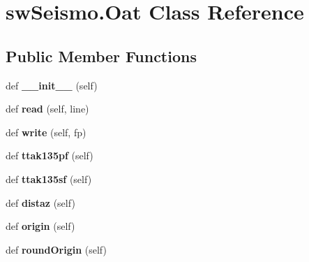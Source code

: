 \hypertarget{classswSeismo_1_1Oat}{}\section{sw\+Seismo.\+Oat Class Reference}
\label{classswSeismo_1_1Oat}
\subsection*{Public Member Functions}
\begin{DoxyCompactItemize}
\item 
\hypertarget{classswSeismo_1_1Oat_a5a2cfee3e2b780b1fb7dc905b30987e0}{}def {\bfseries \+\_\+\+\_\+init\+\_\+\+\_\+} (self)\label{classswSeismo_1_1Oat_a5a2cfee3e2b780b1fb7dc905b30987e0}

\item 
\hypertarget{classswSeismo_1_1Oat_a3a4e0f5e4ab5f54e2933ead6c7fc8518}{}def {\bfseries read} (self, line)\label{classswSeismo_1_1Oat_a3a4e0f5e4ab5f54e2933ead6c7fc8518}

\item 
\hypertarget{classswSeismo_1_1Oat_a74a2cb13afbf529af3086dea509e3858}{}def {\bfseries write} (self, fp)\label{classswSeismo_1_1Oat_a74a2cb13afbf529af3086dea509e3858}

\item 
\hypertarget{classswSeismo_1_1Oat_adb935faf10ad24d4be29a4112ff1925f}{}def {\bfseries ttak135pf} (self)\label{classswSeismo_1_1Oat_adb935faf10ad24d4be29a4112ff1925f}

\item 
\hypertarget{classswSeismo_1_1Oat_a1f69494504e5bf0f05763a9829a75803}{}def {\bfseries ttak135sf} (self)\label{classswSeismo_1_1Oat_a1f69494504e5bf0f05763a9829a75803}

\item 
\hypertarget{classswSeismo_1_1Oat_a696683f740d567a1b9e07d6ecc96d0df}{}def {\bfseries distaz} (self)\label{classswSeismo_1_1Oat_a696683f740d567a1b9e07d6ecc96d0df}

\item 
\hypertarget{classswSeismo_1_1Oat_a71425667351b706b99bc63e32a721ce4}{}def {\bfseries origin} (self)\label{classswSeismo_1_1Oat_a71425667351b706b99bc63e32a721ce4}

\item 
\hypertarget{classswSeismo_1_1Oat_abae1d818a97fd5486cca47f129e21111}{}def {\bfseries round\+Origin} (self)\label{classswSeismo_1_1Oat_abae1d818a97fd5486cca47f129e21111}

\end{DoxyCompactItemize}
